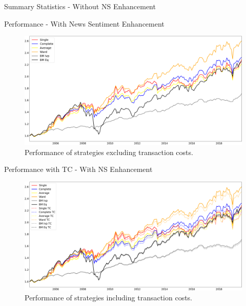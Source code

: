 \begin{frame}{Summary Statistics - Without NS Enhancement}

\end{frame}


\begin{frame}{Performance - With News Sentiment Enhancement}
\begin{figure}[h]
    \centering
    \includegraphics[width=1\textwidth]{Figures/perf_noTC_with_NS_F_2_B_0_LB_12_0.png}
    \caption{Performance of strategies excluding transaction costs.}
\end{figure}
\end{frame}

\begin{frame}{Performance with TC - With NS Enhancement}
\begin{figure}[h]
    \centering
    \includegraphics[width=1\textwidth]{Figures/perf_noTC_andTC_with_NS_F_2_B_0_LB_12_0.png}
    \caption{Performance of strategies including transaction costs.}
\end{figure}
\end{frame}